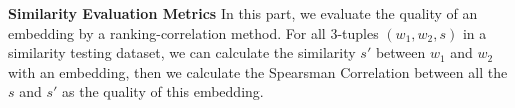 \textbf{Similarity Evaluation Metrics} In this part, we evaluate the quality of an embedding by a ranking-correlation method. For all 3-tuples $(w_1, w_2, s)$ in a similarity testing dataset, we can calculate the similarity $s'$ between $w_1$ and $w_2$ with an embedding, then we calculate the Spearsman Correlation between all the $s$ and $s'$ as the quality of this embedding.
